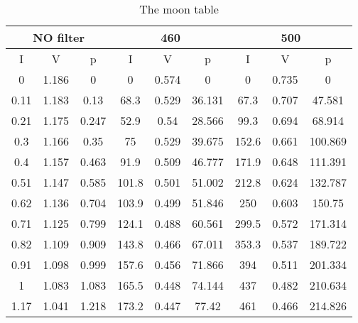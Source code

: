 \begin{table*}[]
\caption{The moon table}
\label{tabmoon}
\begin{tabular}{|c|c|c|c|c|c|c|c|c|}
\hline
\multicolumn{3}{|c|}{NO filter}         & \multicolumn{3}{c|}{460}               & \multicolumn{3}{c|}{500}                \\ \hline
I           & V            & p          & I          & V          & p            & I          & V           & p            \\ \hline
0           & 1.186        & 0          & 0          & 0.574      & 0            & 0          & 0.735       & 0            \\ \hline
0.11        & 1.183        & 0.13       & 68.3       & 0.529      & 36.131       & 67.3       & 0.707       & 47.581       \\ \hline
0.21        & 1.175        & 0.247      & 52.9       & 0.54       & 28.566       & 99.3       & 0.694       & 68.914       \\ \hline
0.3         & 1.166        & 0.35       & 75         & 0.529      & 39.675       & 152.6      & 0.661       & 100.869      \\ \hline
0.4         & 1.157        & 0.463      & 91.9       & 0.509      & 46.777       & 171.9      & 0.648       & 111.391      \\ \hline
0.51        & 1.147        & 0.585      & 101.8      & 0.501      & 51.002       & 212.8      & 0.624       & 132.787      \\ \hline
0.62        & 1.136        & 0.704      & 103.9      & 0.499      & 51.846       & 250        & 0.603       & 150.75       \\ \hline
0.71        & 1.125        & 0.799      & 124.1      & 0.488      & 60.561       & 299.5      & 0.572       & 171.314      \\ \hline
0.82        & 1.109        & 0.909      & 143.8      & 0.466      & 67.011       & 353.3      & 0.537       & 189.722      \\ \hline
0.91        & 1.098        & 0.999      & 157.6      & 0.456      & 71.866       & 394        & 0.511       & 201.334      \\ \hline
1           & 1.083        & 1.083      & 165.5      & 0.448      & 74.144       & 437        & 0.482       & 210.634      \\ \hline
1.17        & 1.041        & 1.218      & 173.2      & 0.447      & 77.42        & 461        & 0.466       & 214.826      \\ \hline

\end{tabular}
\end{table*}

